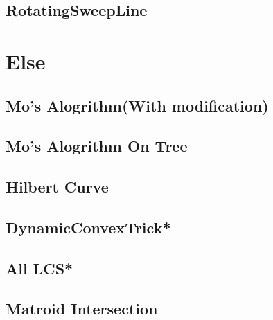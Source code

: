 \subsection{RotatingSweepLine}


\section{Else}
\subsection{Mo's Alogrithm(With modification)}

\subsection{Mo's Alogrithm On Tree}

\subsection{Hilbert Curve}

\subsection{DynamicConvexTrick*} %

%
\subsection{All LCS*} %

% 
\subsection{Matroid Intersection}


